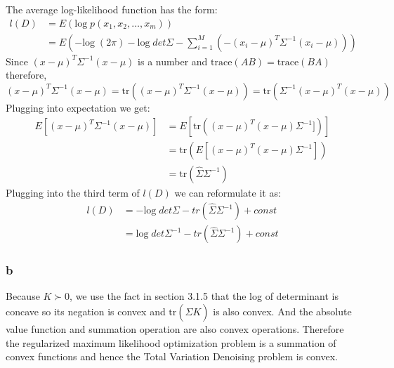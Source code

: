 \message{ !name(ass5_ChangLi.tex)}\documentclass[10pt,a4paper]{article}
\begin{document}
The average log-likelihood function has the form:
\begin{align*}
  l(D) & = E(\text{log}\;p(x_1,x_2,\dots,x_m))\\
       & = E(-\text{log}\;(2\pi) - \text{log}\;det\Sigma
  - \sum_{i=1}^{M}(-(x_i-\mu)^T\Sigma^{-1}(x_i-\mu)))
\end{align*}
Since $(x-\mu)^T\Sigma^{-1}(x-\mu)$ is a number and
$\mathrm{trace}(AB)=\mathrm{trace}(BA)$ therefore,
$$(x-\mu)^T\Sigma^{-1}(x-\mu)= \mathrm{tr}((x-\mu)^T\Sigma^{-1}(x-\mu))=\mathrm{tr}(\Sigma^{-1}(x-\mu)^T(x-\mu))$$ 
Plugging into expectation we get:
\begin{align*}
E[(x-\mu)^T\Sigma^{-1}(x-\mu)] &= E[\mathrm{tr}((x-\mu)^T(x-\mu)\Sigma^{-1}] )] \\
&= \mathrm{tr}(E[(x-\mu)^T(x-\mu)\Sigma^{-1}])\\
&= \mathrm{tr}(\hat{\Sigma}\Sigma^{-1})
\end{align*}
Plugging into the third term of $l(D)$ we can reformulate it as:
\begin{align*}
     l(D) &=- \text{log}\;det\Sigma - tr(\hat{\Sigma}\Sigma^{-1} )+ const \\
       & = \text{log}\;det\Sigma^{-1} - tr(\hat{\Sigma}\Sigma^{-1} ) + const 
\end{align*}

\subsubsection{b}
Because $K\succ 0$, we use the fact in section
3.1.5\cite{boyd2004convex} that the log of determinant is
concave so its negation is convex and
$\mathrm{tr}(\hat{\Sigma}K)$ is also convex. And the
absolute value function and summation operation are also
convex operations. Therefore the regularized maximum
likelihood optimization problem is a summation of convex
functions and hence the Total Variation Denoising problem is
convex.
\end{document}
